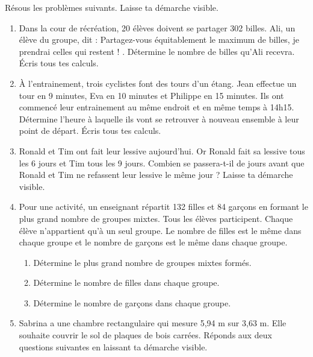%
%
  Résous les problèmes suivants. Laisse ta démarche visible.
  \begin{enumerate}
    \item Dans la cour de récréation, 20 élèves doivent se partager 302 billes. Ali, un élève du groupe, dit : \og Partagez-vous équitablement le maximum de billes, je prendrai celles qui restent ! \fg. Détermine le nombre de billes qu'Ali recevra. Écris tous tes calculs.
    \item À l'entrainement, trois cyclistes font des tours d'un étang. Jean effectue un tour en 9 minutes, Eva en 10 minutes et Philippe en 15 minutes. Ils ont commencé leur entrainement au même endroit et en même temps à 14h15. Détermine l'heure à laquelle ils vont se retrouver à nouveau ensemble à leur point de départ. Écris tous tes calculs.
    \item Ronald et Tim ont fait leur lessive aujourd'hui. Or Ronald fait sa lessive tous les 6 jours et Tim tous les 9 jours. Combien se passera-t-il de jours avant que Ronald et Tim ne refassent leur lessive le même jour ? Laisse ta démarche visible.
    \item Pour une activité, un enseignant répartit 132 filles et 84 garçons en formant le plus grand nombre de groupes mixtes. Tous les élèves participent. Chaque élève n'appartient qu'à un seul groupe. Le nombre de filles est le même dans chaque groupe et le nombre de garçons est le même dans chaque groupe.
          \begin{enumerate}[label=\arabic*)]
            \item Détermine le plus grand nombre de groupes mixtes formés.
            \item Détermine le nombre de filles dans chaque groupe.
            \item Détermine le nombre de garçons dans chaque groupe.
          \end{enumerate}
    \item Sabrina a une chambre rectangulaire qui mesure 5,94 m sur 3,63 m. Elle
          souhaite couvrir le sol de plaques de bois carrées. Réponds aux deux
          questions suivantes en laissant ta démarche visible.

\end{enumerate}
